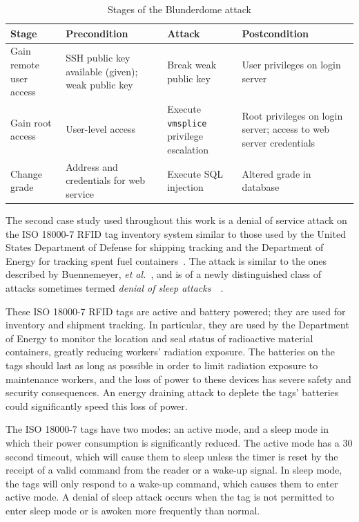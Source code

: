 \begin{table}
\centering %
\begin{tabular}{p{1.5in}|p{1in}|p{1in}|p{1in}}
Stage & Precondition	&	Attack	&	Postcondition \\ \hline \hline
Gain remote user access & SSH public key available (given); weak public key 
	& Break weak public key & User privileges on login server \\ \hline
Gain root access & User-level access & Execute \texttt{vmsplice} privilege escalation 
	& Root privileges on login server; access to web server credentials \\ \hline
Change grade & Address and credentials for web service & Execute SQL injection & Altered grade in database
\end{tabular}
\caption{Stages of the Blunderdome attack}
\label{table:blundertasks}
\end{table}
\label{sec:bg:rfid}
The second case study used throughout this work is a denial of service attack
on the ISO 18000-7 RFID tag inventory system similar to those used by the United States
Department of Defense for shipping tracking and the Department of Energy for tracking spent
fuel containers~\cite{chen2009radiofrequency}. The attack
is similar to the ones described by Buennemeyer, \emph{et al.}~\cite{buennemeyer2006battery},
and is of a newly distinguished class of attacks sometimes termed \emph{denial
of sleep attacks}~\cite{brownfield2005wireless}~\cite{raymond2009effects}.

These ISO 18000-7 RFID tags are active and battery powered; they are used for inventory and
shipment tracking. In particular, they are used by the Department of Energy to monitor
the location and seal status of
radioactive material containers, greatly reducing workers' radiation exposure. 
The batteries on the tags should last as long as
possible in order to limit radiation exposure to maintenance workers, and
the loss of power to these devices has severe safety and security consequences.
An energy draining attack to deplete the tags' batteries could significantly
speed this loss of power.

The ISO 18000-7 tags have two modes: an active mode, and a sleep mode in which their
power consumption is significantly reduced. The active mode has a 30 second timeout,
which will cause them to sleep unless the timer is reset by the receipt of a valid
command from the reader or a wake-up signal. In sleep mode, the tags will only respond to a
wake-up command, which causes them to enter active mode.
A denial of sleep attack occurs when the tag is not permitted to enter sleep mode or is
awoken more frequently than normal.

